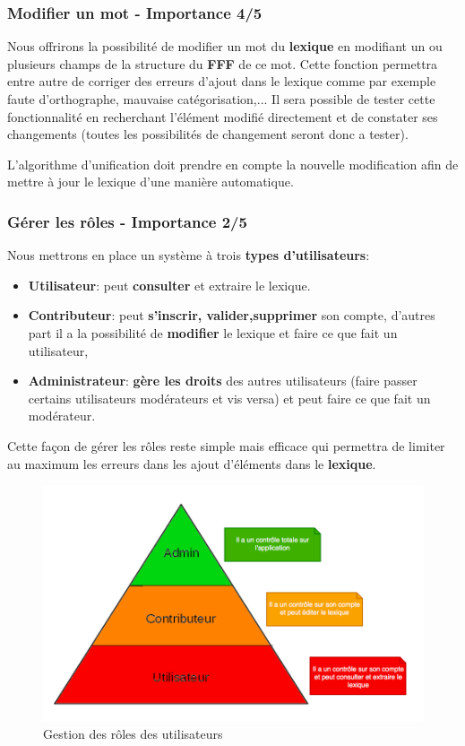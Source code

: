 \subsubsection{Modifier un mot - Importance 4/5}
 
{Nous offrirons la possibilité de modifier un mot du \textbf{lexique} en modifiant un ou plusieurs champs de la structure du \textbf{FFF} de ce mot. Cette fonction permettra entre autre de corriger des erreurs d'ajout dans le lexique comme par exemple faute d'orthographe, mauvaise catégorisation,... Il sera possible de tester cette fonctionnalité en recherchant l'élément modifié directement et de constater ses changements (toutes les possibilités de changement seront donc a tester).\par} L'algorithme d'unification doit prendre en compte la nouvelle modification afin de mettre à jour le lexique d'une manière automatique.
 
\subsubsection{Gérer les rôles - Importance 2/5}
    
    Nous mettrons en place un système à trois \textbf{types d'utilisateurs}:
    \begin{itemize}
    \item \textbf{Utilisateur}:  peut \textbf{consulter} et extraire le lexique.
    \item \textbf{Contributeur}: peut \textbf{s'inscrir, valider,supprimer} son compte, d'autres part il a la possibilité de \textbf{modifier} le lexique et faire ce que fait un utilisateur,
    \item \textbf{Administrateur}: \textbf{gère les droits} des autres utilisateurs (faire passer certains utilisateurs modérateurs et vis versa) et peut faire ce que fait un modérateur.
    \end{itemize}
    {Cette façon de gérer les rôles reste simple mais efficace qui permettra de limiter au maximum les erreurs dans les ajout d'éléments dans le \textbf{lexique}.\par}
    
    \begin{figure}[ht]
        \centering
        \includegraphics[scale=0.3]{role.png}
        \caption{Gestion des rôles des utilisateurs }
    \end{figure}
    \newpage
    

